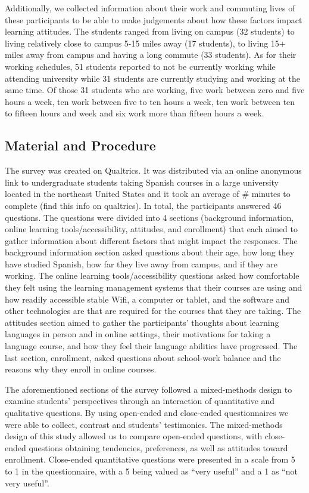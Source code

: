 \documentclass[
  man]{apa6}
\begin{document}
Additionally, we collected information about their work and commuting lives of these participants to be able to make judgements about how these factors impact learning attitudes.
The students ranged from living on campus (32 students) to living relatively close to campus 5-15 miles away (17 students), to living 15+ miles away from campus and having a long commute (33 students).
As for their working schedules, 51 students reported to not be currently working while attending university while 31 students are currently studying and working at the same time.
Of those 31 students who are working, five work between zero and five hours a week, ten work between five to ten hours a week, ten work between ten to fifteen hours and week and six work more than fifteen hours a week.

\hypertarget{material-and-procedure}{%
\subsection{Material and Procedure}\label{material-and-procedure}}

The survey was created on Qualtrics.
It was distributed via an online anonymous link to undergraduate students taking Spanish courses in a large university located in the northeast United States and it took an average of \# minutes to complete (find this info on qualtrics).
In total, the participants answered 46 questions.
The questions were divided into 4 sections (background information, online learning tools/accessibility, attitudes, and enrollment) that each aimed to gather information about different factors that might impact the responses.
The background information section asked questions about their age, how long they have studied Spanish, how far they live away from campus, and if they are working.
The online learning tools/accessibility questions asked how comfortable they felt using the learning management systems that their courses are using and how readily accessible stable Wifi, a computer or tablet, and the software and other technologies are that are required for the courses that they are taking.
The attitudes section aimed to gather the participants' thoughts about learning languages in person and in online settings, their motivations for taking a language course, and how they feel their language abilities have progressed.
The last section, enrollment, asked questions about school-work balance and the reasons why they enroll in online courses.

The aforementioned sections of the survey followed a mixed-methods design to examine students' perspectives through an interaction of quantitative and qualitative questions.
By using open-ended and close-ended questionnaires we were able to collect, contrast and students' testimonies.
The mixed-methods design of this study allowed us to compare open-ended questions, with close-ended questions obtaining tendencies, preferences, as well as attitudes toward enrollment.
Close-ended quantitative questions were presented in a scale from 5 to 1 in the questionnaire, with a 5 being valued as ``very useful'' and a 1 as ``not very useful''.
\end{document}
